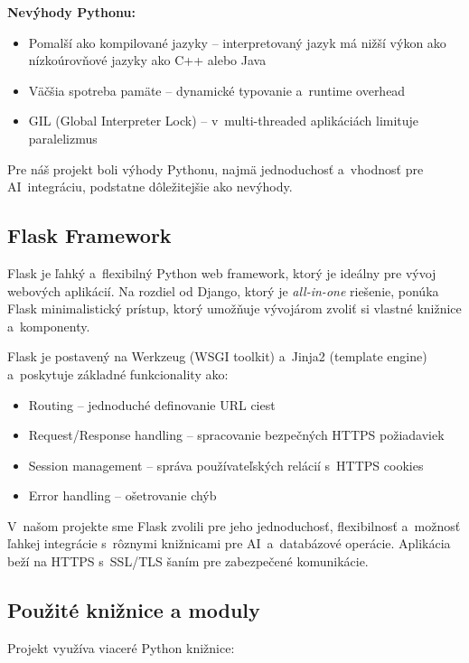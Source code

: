         \textbf{Nevýhody Pythonu:}

\begin{itemize}
  \item Pomalší ako kompilované jazyky -- interpretovaný jazyk má nižší výkon ako
        nízkoúrovňové jazyky ako C++ alebo Java
  \item Väčšia spotreba pamäte -- dynamické typovanie a~runtime overhead
  \item GIL (Global Interpreter Lock) -- v~multi-threaded aplikáciách limituje paralelizmus
\end{itemize}

        Pre náš projekt boli výhody Pythonu, najmä jednoduchosť a~vhodnosť pre AI~integráciu,
podstatne dôležitejšie ako nevýhody.

\subsection{Flask Framework}

        Flask je ľahký a~flexibilný Python web framework, ktorý je ideálny pre vývoj
webových aplikácií. Na rozdiel od Django, ktorý je \emph{all-in-one} riešenie, ponúka Flask
minimalistický prístup, ktorý umožňuje vývojárom zvoliť si vlastné knižnice a~komponenty.

        Flask je postavený na Werkzeug (WSGI toolkit) a~Jinja2 (template engine) a~poskytuje
základné funkcionality ako:

\begin{itemize}
  \item Routing -- jednoduché definovanie URL ciest
  \item Request/Response handling -- spracovanie bezpečných HTTPS požiadaviek
  \item Session management -- správa používateľských relácií s~HTTPS cookies
  \item Error handling -- ošetrovanie chýb
\end{itemize}

        V~našom projekte sme Flask zvolili pre jeho jednoduchosť, flexibilnosť a~možnosť
ľahkej integrácie s~rôznymi knižnicami pre AI~a~databázové operácie. Aplikácia beží
na HTTPS s~SSL/TLS šaním pre zabezpečené komunikácie.

\subsection{Použité knižnice a moduly}

        Projekt využíva viaceré Python knižnice:

